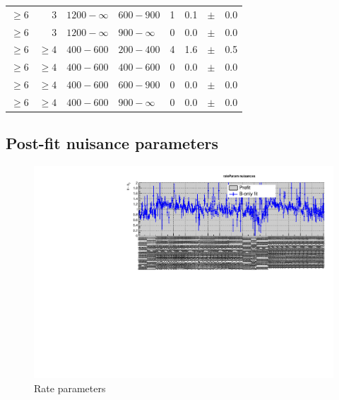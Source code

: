 \begin{table}[!t]
\begin{tabular}{rrllrrcl}
$\geq 6$ & 3 & $1200- \infty$ & $600-900$ &      1 &      0.1 &$\pm$&    0.0 \\
$\geq 6$ & 3 & $1200- \infty$ & $900-\infty$ &      0 &      0.0 &$\pm$&    0.0 \\
$\geq 6$ & $\geq 4$ & $ 400- 600$ & $200-400$ &      4 &      1.6 &$\pm$&    0.5 \\
$\geq 6$ & $\geq 4$ & $ 400- 600$ & $400-600$ &      0 &      0.0 &$\pm$&    0.0 \\
$\geq 6$ & $\geq 4$ & $ 400- 600$ & $600-900$ &      0 &      0.0 &$\pm$&    0.0 \\
$\geq 6$ & $\geq 4$ & $ 400- 600$ & $900-\infty$ &      0 &      0.0 &$\pm$&    0.0 \\
    \hline
  \end{tabular}
\end{table}




%
%

\clearpage
\subsection{Post-fit nuisance parameters}
\label{app:nuispost}

\begin{figure}[h!]
  \centering
  \caption{Rate parameters}
  \includegraphics[width=1.\linewidth]{figures/results/36invfb_preapproval/postfit/nuis/Rates_nuisances}
\end{figure}

